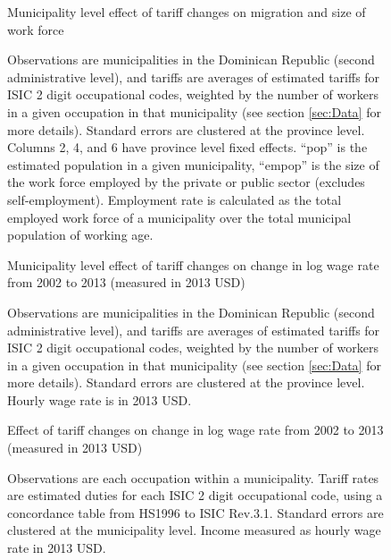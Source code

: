 \documentclass[12pt]{article}
\begin{document}
\begin{landscape}
\begin{figure}[H]
\begin{center}
Municipality level effect of tariff changes on migration and size of work force

\caption{\label{fig:Table3}}
\end{center}
Observations are municipalities in the Dominican Republic (second administrative level),
and tariffs are averages of estimated tariffs for ISIC 2 digit occupational codes,
weighted by the number of workers in a given occupation in that municipality 
(see section \ref{sec:Data} for more details). Standard errors are clustered at the province level.
Columns 2, 4, and 6 have province level fixed effects.
``pop'' is the estimated population in a given municipality, ``empop'' is the size of
the work force employed by the private or public sector (excludes self-employment).
Employment rate is calculated as the total employed work force of a municipality
over the total municipal population of working age.
\end{figure}

\begin{figure}[H]
\begin{center}
Municipality level effect of tariff changes on change in log wage rate from 2002 to 2013 (measured
in 2013 USD)

\caption{\label{fig:Table1}}
\end{center}
Observations are municipalities in the Dominican Republic (second administrative level),
and tariffs are averages of estimated tariffs for ISIC 2 digit occupational codes,
weighted by the number of workers in a given occupation in that municipality 
(see section \ref{sec:Data} for more details). Standard errors are clustered at the province level.
Hourly wage rate is in 2013 USD.
\end{figure}

\begin{figure}[H]
\begin{center}
Effect of tariff changes on change in log wage rate from 2002 to 2013 (measured in 2013 USD)

\caption{\label{fig:Table2}}
\end{center}
Observations are each occupation within a municipality.
Tariff rates are estimated duties for each ISIC 2 digit occupational code,
using a concordance table from HS1996 to ISIC Rev.3.1. Standard errors are clustered at the 
municipality level. Income measured as hourly wage rate in 2013 USD.
\end{figure}


\end{landscape}
\end{document}
